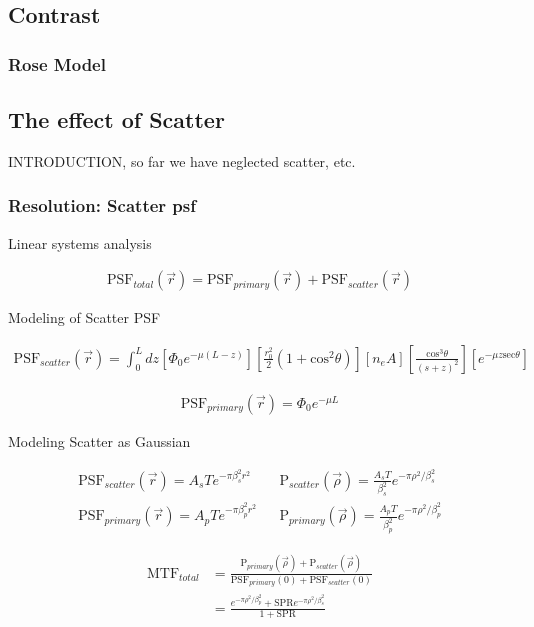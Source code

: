 \documentclass[mphy386-notes.tex]{subfiles}
\begin{document}
\subsection{Contrast}
\subsubsection{Rose Model}

\subsection{The effect of Scatter}

INTRODUCTION, so far we have neglected scatter, etc.

\subsubsection{Resolution: Scatter psf}

Linear systems analysis

\begin{align}
  \text{PSF}_{total} (\vec{r}) = \text{PSF}_{primary}(\vec{r}) + \text{PSF}_{scatter}(\vec{r})
\end{align}

Modeling of Scatter PSF

\begin{align}
  \text{PSF}_{scatter}(\vec{r}) = \int_0^L dz\left[\Phi_0 e^{-\mu(L-z)}\right]\left[\frac{r_0^2}{2}\left(1 + \text{cos}^2\theta\right)\right]\left[n_e A\right]\left[\frac{\text{cos}^3\theta}{(s+z)^2}\right]\left[e^{-\mu z\text{sec}\theta}\right]
\end{align}

\begin{align}
  \text{PSF}_{primary}(\vec{r}) = \Phi_0 e^{-\mu L}
\end{align}

Modeling Scatter as Gaussian

\begin{align}
  \text{PSF}_{scatter}(\vec{r}) = A_s T e^{-\pi \beta_s^2 r^2} & & \text{P}_{scatter}(\vec{\rho}) = \frac{A_s T}{\beta_s^2}e^{-\pi \rho^2 / \beta_s^2}\\
  \text{PSF}_{primary}(\vec{r}) = A_p T e^{-\pi \beta_p^2 r^2} & & \text{P}_{primary}(\vec{\rho}) = \frac{A_p T}{\beta_p^2}e^{-\pi \rho^2 / \beta_p^2}
\end{align}

\begin{align}
  \text{MTF}_{total} &= \frac{\text{P}_{primary}(\vec{\rho}) + \text{P}_{scatter}(\vec{\rho})}{\text{PSF}_{primary}(0) + \text{PSF}_{scatter}(0)}\\
  &= \frac{e^{-\pi\rho^2/\beta_p^2} + \text{SPR}e^{-\pi\rho^2/\beta_s^2}}{1 + \text{SPR}}
\end{align}
\end{document}
